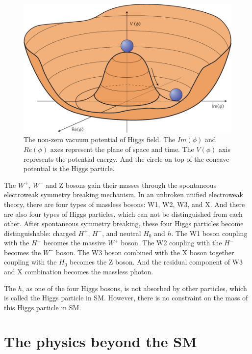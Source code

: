 \begin{figure}[!htbp]
\centering
\includegraphics[width=.7\textwidth]{figures/Higgs-potential.jpg}
\caption{The non-zero vacuum potential of Higgs field. The $Im(\phi)$ and $Re(\phi)$ axes represent
the plane of space and time. The $V(\phi)$ axis represents the potential energy. And the circle
on top of the concave potential is the Higgs particle.}
\label{fig:Higgs}
\end{figure}  


The $W^+$, $W^-$ and Z bosons gain their masses through the spontaneous electroweak symmetry breaking mechanism.
In an unbroken unified electroweak theory, there are four types of massless bosons: W1, W2, W3, and X. And there are also four types of Higgs particles, which can not be distinguished from each other. After spontaneous symmetry breaking, these four Higgs particles become distinguishable: charged $H^+$, $H^-$, and neutral $H_0$ and $h$. 
The W1 boson coupling with the $H^+$ becomes the massive $W^+$ boson. The W2 coupling
with the $H^-$ becomes the $W^-$ boson. The W3 boson combined with the X boson together coupling with the $H_0$ becomes the Z boson. And the residual component of W3 and X combination becomes the massless photon. 

The $h$, as one of the four Higgs bosons, is not absorbed by other particles, which is called
the Higgs particle in SM.  However, there is no constraint on the mass of this Higgs particle in SM.



\section{The physics beyond the SM}

